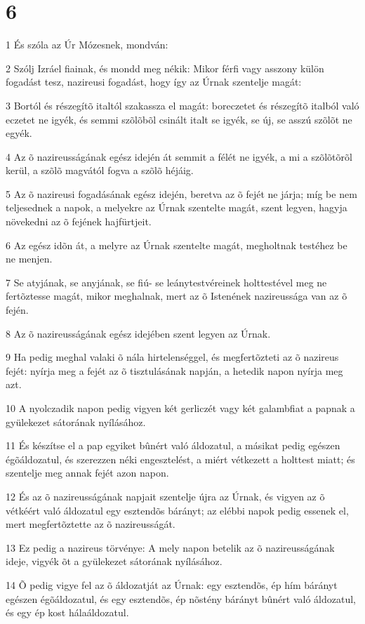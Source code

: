 \chapter{6}

\par 1 És szóla az Úr Mózesnek, mondván:
\par 2 Szólj Izráel fiainak, és mondd meg nékik: Mikor férfi vagy asszony külön fogadást tesz, nazireusi fogadást, hogy így az Úrnak szentelje magát:
\par 3 Bortól és részegítõ italtól szakassza el magát: boreczetet és részegítõ italból való eczetet ne igyék, és semmi szõlõbõl csinált italt se igyék, se új, se asszú szõlõt ne egyék.
\par 4 Az õ nazireusságának egész idején át semmit a félét ne igyék, a mi a szõlõtõrõl kerül, a szõlõ magvától fogva a szõlõ héjáig.
\par 5 Az õ nazireusi fogadásának egész idején, beretva az õ fejét ne járja; míg be nem teljesednek a napok, a melyekre az Úrnak szentelte magát, szent legyen, hagyja növekedni az õ fejének hajfürtjeit.
\par 6 Az egész idõn át, a melyre az Úrnak szentelte magát, megholtnak testéhez be ne menjen.
\par 7 Se atyjának, se anyjának, se fiú- se leánytestvéreinek holttestével meg ne fertõztesse magát, mikor meghalnak, mert az õ Istenének nazireussága van az õ fején.
\par 8 Az õ nazireusságának egész idejében szent legyen az Úrnak.
\par 9 Ha pedig meghal valaki õ nála hirtelenséggel, és megfertõzteti az õ nazireus fejét: nyírja meg a fejét az õ tisztulásának napján, a hetedik napon nyírja meg azt.
\par 10 A nyolczadik napon pedig vigyen két gerliczét vagy két galambfiat a papnak a gyülekezet sátorának nyílásához.
\par 11 És készítse el a pap egyiket bûnért való áldozatul, a másikat pedig egészen égõáldozatul, és szerezzen néki engesztelést, a miért vétkezett a holttest miatt; és szentelje meg annak fejét azon napon.
\par 12 És az õ nazireusságának napjait szentelje újra az Úrnak, és vigyen az õ vétkéért való áldozatul egy esztendõs bárányt; az elébbi napok pedig essenek el, mert megfertõztette az õ nazireusságát.
\par 13 Ez pedig a nazireus törvénye: A mely napon betelik az õ nazireusságának ideje, vigyék õt a gyülekezet sátorának nyílásához.
\par 14 Õ pedig vigye fel az õ áldozatját az Úrnak: egy esztendõs, ép hím bárányt egészen égõáldozatul, és egy esztendõs, ép nõstény bárányt bûnért való áldozatul, és egy ép kost hálaáldozatul.
